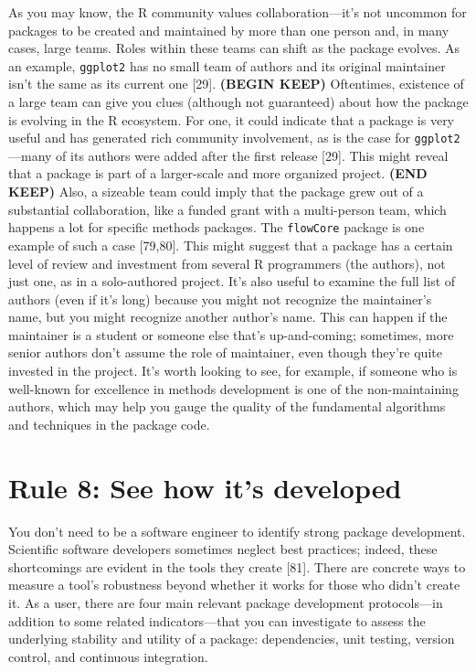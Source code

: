 \documentclass[10pt,letterpaper]{article}
\begin{document}
As you may know, the R community values collaboration---it's not
uncommon for packages to be created and maintained by more than one
person and, in many cases, large teams. Roles within these teams can
shift as the package evolves. As an example, \texttt{ggplot2} has no
small team of authors and its original maintainer isn't the same as its
current one {[}29{]}. \textbf{(BEGIN KEEP)} Oftentimes, existence of a
large team can give you clues (although not guaranteed) about how the
package is evolving in the R ecosystem. For one, it could indicate that
a package is very useful and has generated rich community involvement,
as is the case for \texttt{ggplot2}---many of its authors were added
after the first release {[}29{]}. This might reveal that a package is
part of a larger-scale and more organized project. \textbf{(END KEEP)}
Also, a sizeable team could imply that the package grew out of a
substantial collaboration, like a funded grant with a multi-person team,
which happens a lot for specific methods packages. The \texttt{flowCore}
package is one example of such a case {[}79,80{]}. This might suggest
that a package has a certain level of review and investment from several
R programmers (the authors), not just one, as in a solo-authored
project. It's also useful to examine the full list of authors (even if
it's long) because you might not recognize the maintainer's name, but
you might recognize another author's name. This can happen if the
maintainer is a student or someone else that's up-and-coming; sometimes,
more senior authors don't assume the role of maintainer, even though
they're quite invested in the project. It's worth looking to see, for
example, if someone who is well-known for excellence in methods
development is one of the non-maintaining authors, which may help you
gauge the quality of the fundamental algorithms and techniques in the
package code.

\hypertarget{rule-8-see-how-its-developed}{%
\section{Rule 8: See how it's
developed}\label{rule-8-see-how-its-developed}}

You don't need to be a software engineer to identify strong package
development. Scientific software developers sometimes neglect best
practices; indeed, these shortcomings are evident in the tools they
create {[}81{]}. There are concrete ways to measure a tool's robustness
beyond whether it works for those who didn't create it. As a user, there
are four main relevant package development protocols---in addition to
some related indicators---that you can investigate to assess the
underlying stability and utility of a package: dependencies, unit
testing, version control, and continuous integration.
\end{document}
